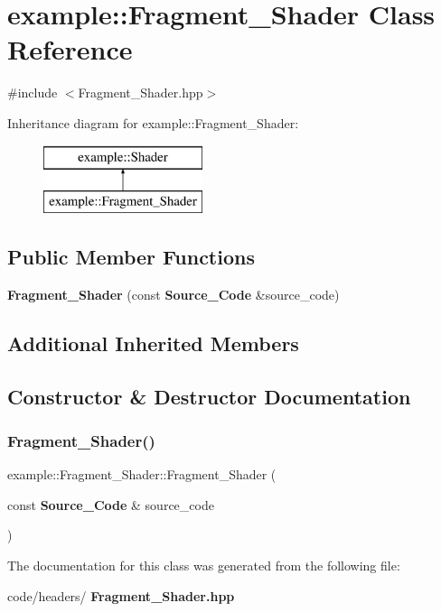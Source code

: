 \section{example\+::Fragment\+\_\+\+Shader Class Reference}
\label{classexample_1_1_fragment___shader}


{\ttfamily \#include $<$Fragment\+\_\+\+Shader.\+hpp$>$}

Inheritance diagram for example\+::Fragment\+\_\+\+Shader\+:\begin{figure}[H]
\begin{center}
\leavevmode
\includegraphics[height=2.000000cm]{classexample_1_1_fragment___shader}
\end{center}
\end{figure}
\subsection*{Public Member Functions}
\begin{DoxyCompactItemize}
\item 
\textbf{ Fragment\+\_\+\+Shader} (const \textbf{ Source\+\_\+\+Code} \&source\+\_\+code)
\end{DoxyCompactItemize}
\subsection*{Additional Inherited Members}


\subsection{Constructor \& Destructor Documentation}
\mbox{\label{classexample_1_1_fragment___shader_a3950097f56bb66b2bf35ce2942976744}} 
\subsubsection{Fragment\_Shader()}
{\footnotesize\ttfamily example\+::\+Fragment\+\_\+\+Shader\+::\+Fragment\+\_\+\+Shader (\begin{DoxyParamCaption}\item[{const \textbf{ Source\+\_\+\+Code} \&}]{source\+\_\+code }\end{DoxyParamCaption})\hspace{0.3cm}{\ttfamily [inline]}}



The documentation for this class was generated from the following file\+:\begin{DoxyCompactItemize}
\item 
code/headers/\textbf{ Fragment\+\_\+\+Shader.\+hpp}\end{DoxyCompactItemize}
